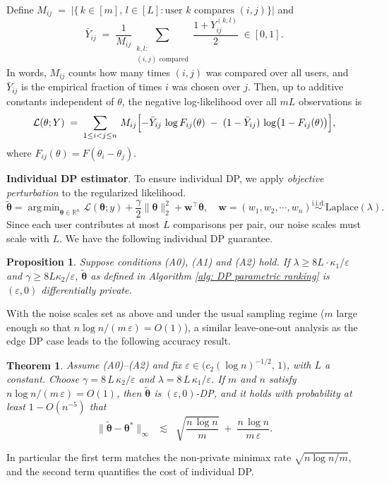 \documentclass[letterpaper,12pt]{article}
\numberwithin{equation}{section}
\theoremstyle{plain}
\newtheorem{Theorem}{Theorem}
\numberwithin{Theorem}{section}
\numberwithin{corollary}{section}
\newtheorem{proposition}{Proposition}
\numberwithin{proposition}{section}
\numberwithin{Lemma}{section}
{
	\theoremstyle{definition}
	\newtheorem{Definition}{Definition}
	\newtheorem{example}{Example}
	\numberwithin{example}{section}
	\newtheorem{fact}{Fact}
	\numberwithin{fact}{section}
	\newtheorem{remark}{Remark}
}
\newcommand{\1}{\mathbbm{1}}
\def\bth{{\boldsymbol{\theta}}}
\DeclareMathOperator*{\argmin}{arg\,min}
\def\R{{\mathbb R}}
\begin{document}
Define $M_{ij} \;=\; \left|\bigl\{\,k\in[m],\,l\in[L]:\text{user }k\text{ compares }(i,j)\bigr\}\right|$ and
\[
\bar Y_{ij} \;=\; \frac{1}{M_{ij}}
\sum_{\substack{k,l:\\(i,j)\text{ compared}}}
\frac{1+Y_{ij}^{(k,l)}}{2}
\;\in[0,1].
\]
 In words, \(M_{ij}\) counts how many times \((i,j)\) was compared over all users, and \(\bar Y_{ij}\) is the empirical fraction of times \(i\) was chosen over \(j\).
Then, up to additive constants independent of \(\theta\), the negative log-likelihood over all \(mL\) observations is
\[
\mathcal{L}(\theta;Y)
\;=\;
\sum_{1\le i<j\le n}\,
M_{ij}\Bigl[
-\bar Y_{ij}\,\log F_{ij}(\theta)\;-\;(1-\bar Y_{ij})\,\log\bigl(1-F_{ij}(\theta)\bigr)
\Bigr],
\]
where \(F_{ij}(\theta)=F(\theta_i-\theta_j)\). 

\vspace{0.3em}
\noindent
\textbf{Individual DP estimator}.  To ensure individual DP, we apply \emph{objective perturbation} to the regularized likelihood.
\begin{equation}
\widetilde \bth = \argmin_{\bth \in \R^n} \mathcal L(\bth; y) + \frac{\gamma}{2}\|\bth\|_2^2 + \bm w^\top \bth, \quad \bm w = (w_1, w_2, \cdots, w_n) \stackrel{\text{i.i.d.}}{\sim }\text{Laplace}(\lambda).
\end{equation}
 Since each user contributes at most \(L\) comparisons per pair, our noise scales must scale with $L$. We have the following individual DP guarantee.
\begin{proposition}\label{prop: individual ranking MLE privacy}
	Suppose conditions (A0), (A1) and (A2) hold. If $\lambda \geq 8L \cdot \kappa_1/\varepsilon$ and $\gamma \geq 8L\kappa_2/\varepsilon$, $\widetilde\bth$ as defined in Algorithm \ref{alg: DP parametric ranking} is $(\varepsilon, 0)$ differentially private.
\end{proposition}
 With the noise scales set as above and under the usual sampling regime (\(m\) large enough so that \(n\log n/(m\,\varepsilon)=O(1)\)), a similar leave-one-out analysis as the edge DP case leads to the following accuracy result.

\begin{Theorem}
	\label{thm:idp-linf}
	Assume (A0)--(A2) and fix 
	\(\varepsilon\in\bigl(c_{2}(\log n)^{-1/2},\,1\bigr)\),
	with \(L\) a constant.  Choose 
	\(\gamma = 8\,L\,\kappa_{2}/\varepsilon\) 
	and 
	\(\lambda = 8\,L\,\kappa_{1}/\varepsilon\).  
	If \(m\) and \(n\) satisfy \(n\log n/(m\,\varepsilon)=O(1)\), then \(\widetilde{\bth}\) is \((\varepsilon,0)\)-DP, and it holds with probability at least $1-O(n^{-5})$ that
	\[
	\|\widetilde{\bth}-\bth^{*}\|_{\infty}
	\;\;\lesssim\;\;
	\sqrt{\frac{n\,\log n}{m}}
	\;+\;
	\frac{n\,\log n}{m\,\varepsilon}.
	\]
\end{Theorem}
In particular the first term matches the non-private minimax rate \(\sqrt{n\log n/m}\), and the second term quantifies the cost of individual DP.  
\end{document}
